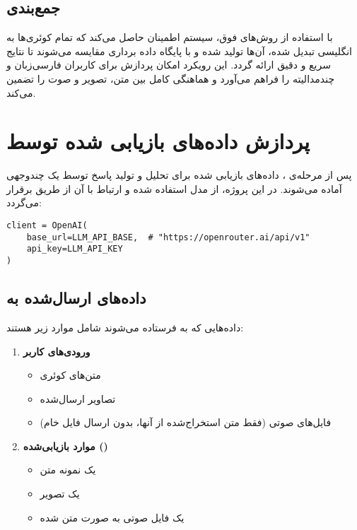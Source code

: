 \documentclass{article}
\begin{document}
\subsection{جمع‌بندی}
با استفاده از روش‌های فوق، سیستم اطمینان حاصل می‌کند که تمام کوئری‌ها به انگلیسی تبدیل شده،  آن‌ها تولید شده و با پایگاه داده برداری مقایسه می‌شوند تا نتایج  سریع و دقیق ارائه گردد.
این رویکرد امکان پردازش  برای کاربران فارسی‌زبان و چندمدالیته را فراهم می‌آورد و هماهنگی کامل بین متن، تصویر و صوت را تضمین می‌کند.


\section{پردازش داده‌های بازیابی شده توسط }
پس از مرحله‌ی ، داده‌های بازیابی شده برای تحلیل و تولید پاسخ توسط یک  چندوجهی آماده می‌شوند.
در این پروژه، از مدل  استفاده شده و ارتباط با آن از طریق  برقرار می‌گردد:

\begin{latin}
\begin{lstlisting}
client = OpenAI(
    base_url=LLM_API_BASE,  # "https://openrouter.ai/api/v1"
    api_key=LLM_API_KEY
)
\end{lstlisting}
\end{latin}

\subsection{داده‌های ارسال‌شده به }
داده‌هایی که به  فرستاده می‌شوند شامل موارد زیر هستند:

\begin{enumerate}
\item \textbf{ورودی‌های کاربر}
\begin{itemize}
\item متن‌های کوئری
\item تصاویر ارسال‌شده
\item فایل‌های صوتی (فقط متن استخراج‌شده از آنها، بدون ارسال فایل خام)
\end{itemize}

\item \textbf{موارد بازیابی‌شده ()}
\begin{itemize}
\item یک نمونه متن 
\item یک تصویر 
\item یک فایل صوتی  به صورت متن  شده
\end{itemize}
\end{enumerate}
\end{document}

